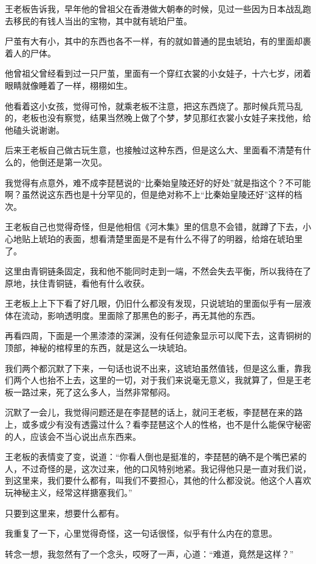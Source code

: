 王老板告诉我，早年他的曾祖父在香港做大朝奉的时候，见过一些因为日本战乱跑去移民的有钱人当出的宝物，其中就有琥珀尸茧。

尸茧有大有小，其中的东西也各不一样，有的就如普通的昆虫琥珀，有的里面却裹着人的尸体。

他曾祖父曾经看到过一只尸茧，里面有一个穿红衣裳的小女娃子，十六七岁，闭着眼睛就像睡着了一样，栩栩如生。

他看着这小女孩，觉得可怜，就乘老板不注意，把这东西烧了。那时候兵荒马乱的，老板也没有察觉，结果当然晚上做了个梦，梦见那红衣裳小女娃子来找他，给他磕头说谢谢。

后来王老板自己做古玩生意，也接触过这种东西，但是这么大、里面看不清楚有什么的，他倒还是第一次见。

我觉得有点意外，难不成李琵琶说的“比秦始皇陵还好的好处”就是指这个？不可能啊？虽然说这东西也是十分罕见的，但是绝对称不上“比秦始皇陵还好”这样的档次。

王老板自己也觉得奇怪，但是他相信《河木集》里的信息不会错，就蹲了下去，小心地贴上琥珀的表面，想看清楚里面是不是有什么不得了的明器，给熔在琥珀里了。

这里由青铜链条固定，我和他不能同时走到一端，不然会失去平衡，所以我待在了原地，扶住青铜链，看他有什么收获。

王老板上上下下看了好几眼，仍旧什么都没有发现，只说琥珀的里面似乎有一层液体在流动，影响透明度。里面除了那黑色的影子，再无其他的东西。

再看四周，下面是一个黑漆漆的深渊，没有任何迹象显示可以爬下去，这青铜树的顶部，神秘的棺椁里的东西，就是这么一块琥珀。

我们两个都沉默了下来，一句话也说不出来，这琥珀虽然值钱，但是这么重，靠我们两个人也抬不上去，这里的一切，对于我们来说毫无意义，我就算了，但是王老板一路过来，死了这么多人，当然非常郁闷。

沉默了一会儿，我觉得问题还是在李琵琶的话上，就问王老板，李琵琶在来的路上，或多或少有没有透露过什么？看李琵琶这个人的性格，也不是什么能保守秘密的人，应该会不当心说出点东西来。

王老板的表情变了变，说道：“你看人倒也是挺准的，李琵琶的确不是个嘴巴紧的人，不过奇怪的是，这次过来，他的口风特别地紧。我记得他只是一直对我们说，到这里来，我们要什么都有，叫我们不要担心，其他的什么都没说。他这个人喜欢玩神秘主义，经常这样搪塞我们。”

只要到这里来，想要什么都有。

我重复了一下，心里觉得奇怪，这一句话很怪，似乎有什么内在的意思。

转念一想，我忽然有了一个念头，哎呀了一声，心道：“难道，竟然是这样？”

